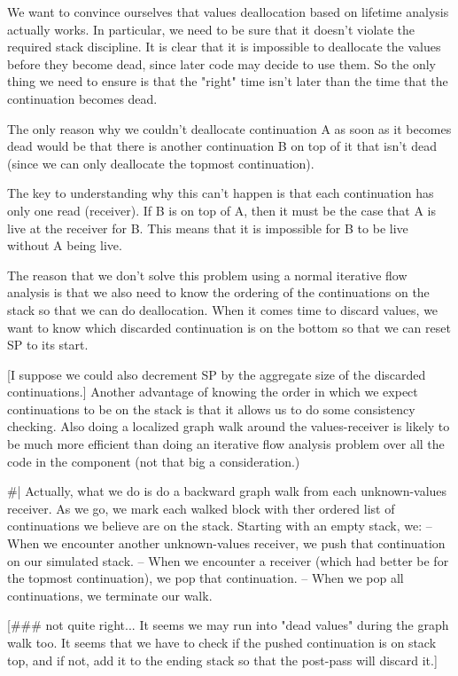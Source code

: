 We want to convince ourselves that values deallocation based on lifetime
analysis actually works.  In particular, we need to be sure that it doesn't
violate the required stack discipline.  It is clear that it is impossible to
deallocate the values before they become dead, since later code may decide to
use them.  So the only thing we need to ensure is that the "right" time isn't
later than the time that the continuation becomes dead.

The only reason why we couldn't deallocate continuation A as soon as it becomes
dead would be that there is another continuation B on top of it that isn't dead
(since we can only deallocate the topmost continuation).

The key to understanding why this can't happen is that each continuation has
only one read (receiver).  If B is on top of A, then it must be the case that A
is live at the receiver for B.  This means that it is impossible for B to be
live without A being live.


The reason that we don't solve this problem using a normal iterative flow
analysis is that we also need to know the ordering of the continuations on the
stack so that we can do deallocation.  When it comes time to discard values, we
want to know which discarded continuation is on the bottom so that we can reset
SP to its start.  

[I suppose we could also decrement SP by the aggregate size of the discarded
continuations.]  Another advantage of knowing the order in which we expect
continuations to be on the stack is that it allows us to do some consistency
checking.  Also doing a localized graph walk around the values-receiver is
likely to be much more efficient than doing an iterative flow analysis problem
over all the code in the component (not that big a consideration.)



\#|
Actually, what we do is do a backward graph walk from each unknown-values
receiver.   As we go, we mark each walked block with ther ordered list of
continuations we believe are on the stack.  Starting with an empty stack, we:
 -- When we encounter another unknown-values receiver, we push that
    continuation on our simulated stack.
 -- When we encounter a receiver (which had better be for the topmost
    continuation), we pop that continuation.
 -- When we pop all continuations, we terminate our walk.

[\#\#\# not quite right...  It seems we may run into "dead values" during the
graph walk too.  It seems that we have to check if the pushed continuation is
on stack top, and if not, add it to the ending stack so that the post-pass will
discard it.]



